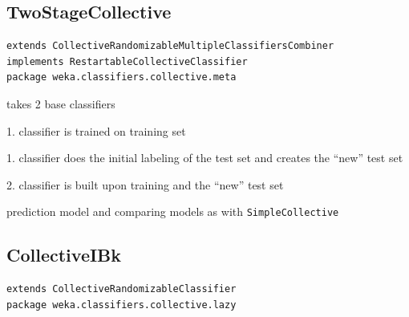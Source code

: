 \documentclass[a4paper]{book}
\begin{document}
\subsection{TwoStageCollective}
\begin{verbatim}
extends CollectiveRandomizableMultipleClassifiersCombiner
implements RestartableCollectiveClassifier
package weka.classifiers.collective.meta
\end{verbatim}

\begin{tight_itemize}
	\item takes 2 base classifiers
	\item 1. classifier is trained on training set 
	\item 1. classifier does the initial labeling of the test set and creates the ``new'' test set
	\item 2. classifier is built upon training and the ``new'' test set
	\item prediction model and comparing models as with \texttt{SimpleCollective}
\end{tight_itemize}

\subsection{CollectiveIBk}
\begin{verbatim}
extends CollectiveRandomizableClassifier
package weka.classifiers.collective.lazy
\end{verbatim}
\end{document}
